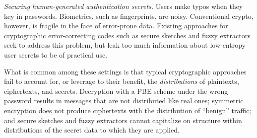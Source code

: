 {\begin{newitemize}

\item{\em Securing human-generated authentication secrets.} Users make typos
when they key in passwords. Biometrics, such as fingerprints, are noisy.
Conventional crypto, however, is fragile in the face of error-prone data. 
Existing approaches for cryptographic error-correcting codes such as secure
sketches and fuzzy extractors~\cite{DORS08} seek to address this problem, but leak too much
information about low-entropy user secrets to be of practical use.
\end{newitemize}
What is common among these settings is that 
typical cryptographic approaches fail to account for, or leverage to
their benefit, the \textit{distributions} of plaintexts, ciphertexts, and
secrets.
Decryption with a PBE scheme under the wrong
password results in messages that are not distributed like real ones; symmetric
encryption does not produce ciphertexts with the distribution of ``benign''
traffic; and secure sketches and fuzzy extractors cannot capitalize on structure within
distributions of the secret data to which they are applied. 

}
